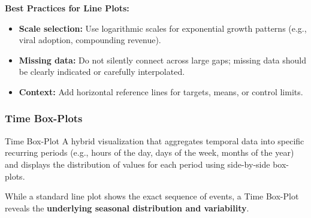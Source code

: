 \textbf{Best Practices for Line Plots:}
\begin{itemize}
    \item \textbf{Scale selection:} Use logarithmic scales for exponential growth patterns (e.g., viral adoption, compounding revenue).
    \item \textbf{Missing data:} Do not silently connect across large gaps; missing data should be clearly indicated or carefully interpolated.
    \item \textbf{Context:} Add horizontal reference lines for targets, means, or control limits.
\end{itemize}

\subsubsection{Time Box-Plots}

\begin{defbox}{Time Box-Plot}
A hybrid visualization that aggregates temporal data into specific recurring periods (e.g., hours of the day, days of the week, months of the year) and displays the distribution of values for each period using side-by-side box-plots.
\end{defbox}

While a standard line plot shows the exact sequence of events, a Time Box-Plot reveals the \textbf{underlying seasonal distribution and variability}.



